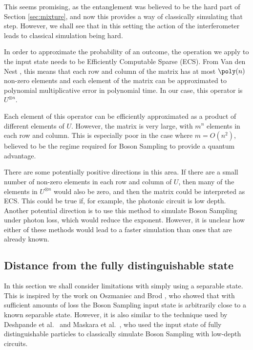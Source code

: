 This seems promising, as the entanglement was believed to be the hard part of Section \ref{sec:mixture}, and now this provides a way of classically simulating that step. However, we shall see that in this setting the action of the interferometer leads to classical simulation being hard.

In order to approximate the probability of an outcome, the operation we apply to the input state needs to be Efficiently Computable Sparse (ECS). From Van den Nest \cite{vandennest2011}, this means that each row and column of the matrix has at most $\poly(n)$ non-zero elements and each element of the matrix can be approximated to polynomial multiplicative error in polynomial time. In our case, this operator is $U^{\otimes n}$.

Each element of this operator can be efficiently approximated as a product of different elements of $U$. However, the matrix is very large, with $m^n$ elements in each row and column. This is especially poor in the case where $m = O(n^2)$, believed to be the regime required for Boson Sampling to provide a quantum advantage.

There are some potentially positive directions in this area. If there are a small number of non-zero elements in each row and column of $U$, then many of the elements in $U^{\otimes n}$ would also be zero, and then the matrix could be interpreted as ECS. This could be true if, for example, the photonic circuit is low depth. Another potential direction is to use this method to simulate Boson Sampling under photon loss, which would reduce the exponent. However, it is unclear how either of these methods would lead to a faster simulation than ones that are already known.

\subsection{Distance from the fully distinguishable state}
\label{ssec:fixed-dist-distance}

In this section we shall consider limitations with simply using a separable state. This is inspired by the work on Oszmaniec and Brod \cite{oszmaniec2018}, who showed that with sufficient amounts of loss the Boson Sampling input state is arbitrarily close to a known separable state. However, it is also similar to the technique used by Deshpande et al.~\cite{deshpande2018} and Maskara et al.~\cite{maskara2019}, who used the input state of fully distinguishable particles to classically simulate Boson Sampling with low-depth circuits.

